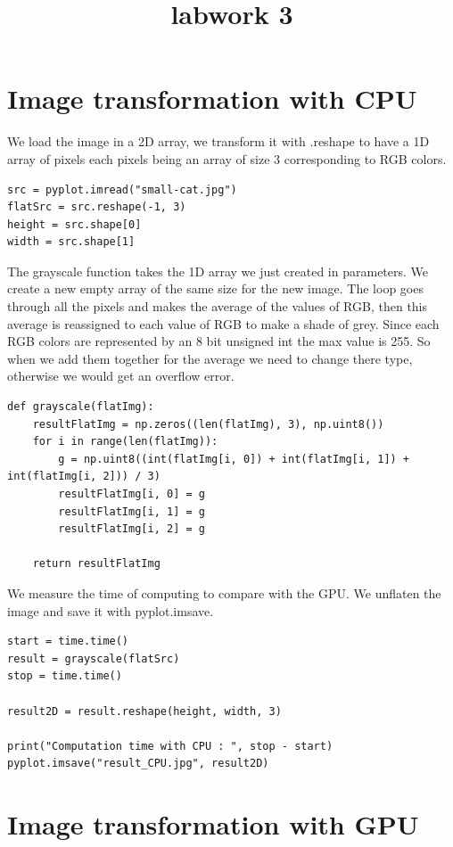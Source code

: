 \documentclass{report}
\begin{document}
\title{labwork 3}
\maketitle

\section{Image transformation with CPU}
We load the image in a 2D array, we transform it with .reshape to have a 1D array of pixels each pixels being an array of size 3 corresponding to RGB colors.
\begin{lstlisting}
src = pyplot.imread("small-cat.jpg")
flatSrc = src.reshape(-1, 3)
height = src.shape[0]
width = src.shape[1]
\end{lstlisting}
The grayscale function takes the 1D array we just created in parameters.
We create a new empty array of the same size for the new image. The loop goes through all the pixels and makes the average of the values of RGB, then this average is reassigned to each value of RGB to make a shade of grey.
\newline
\newline
Since each RGB colors are represented by an 8 bit unsigned int the max value is 255. So when we add them together for the average we need to change there type, otherwise we would get an overflow error.
\begin{lstlisting}
def grayscale(flatImg):
    resultFlatImg = np.zeros((len(flatImg), 3), np.uint8())
    for i in range(len(flatImg)):
        g = np.uint8((int(flatImg[i, 0]) + int(flatImg[i, 1]) + int(flatImg[i, 2])) / 3)
        resultFlatImg[i, 0] = g
        resultFlatImg[i, 1] = g
        resultFlatImg[i, 2] = g

    return resultFlatImg
\end{lstlisting}
We measure the time of computing to compare with the GPU. We unflaten the image and save it with pyplot.imsave.

\begin{lstlisting}
start = time.time()
result = grayscale(flatSrc)
stop = time.time()

result2D = result.reshape(height, width, 3)

print("Computation time with CPU : ", stop - start)
pyplot.imsave("result_CPU.jpg", result2D)
\end{lstlisting}
\newpage

\section{Image transformation with GPU}
\end{document}
